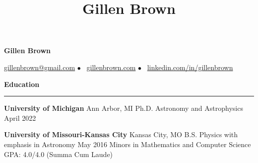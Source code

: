 \documentclass[10pt]{article}
\title{Gillen Brown}
\newcommand{\todo}[1]{\textcolor{red}{[\bf #1]}}
\newcommand{\spacer}{$\bullet$ \ }
\newcommand{\header}[1]{\vspace{1.0em}\par \textbf{\large #1}\strut\hrule\vspace{-0.9em}}
\newcommand{\actionHeader}[2]{\vspace{0.6em}\textbf{#1} \hfill #2}
\newcommand{\indentedItemDate}[2]{\newline\null\qquad #1 \hfill #2}
\newcommand{\indentedItem}[1]{\newline\null\qquad #1}
\begin{document}
\thispagestyle{empty}


\begin{center}
{\LARGE \bf Gillen Brown}

{\normalsize \href{mailto:gillenbrown@gmail.com}{gillenbrown@gmail.com} \spacer \href{https://www.gillenbrown.com}{gillenbrown.com} \spacer \href{http://www.linkedin.com/in/gillenbrown}{linkedin.com/in/gillenbrown}}
\end{center}



\header{Education}
\actionHeader{University of Michigan}{Ann Arbor, MI}
\indentedItemDate{Ph.D. Astronomy and Astrophysics}{April 2022}
\vspace{-0.5em}

\actionHeader{University of Missouri-Kansas City}{Kansas City, MO}
\indentedItemDate{B.S. Physics with emphasis in Astronomy}{May 2016}
\indentedItem{Minors in Mathematics and Computer Science}
\indentedItem{GPA: 4.0/4.0  (Summa Cum Laude)}
\vspace{-0.3em}
\end{document}
